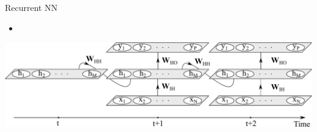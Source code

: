 \begin{xframe}{Recurrent NN}

    \begin{itemize}
        \item {}
    \end{itemize}

    \includegraphics[width=\textwidth,totalheight=0.5\textheight]{./style/images/srnn.pdf}

\end{xframe}

